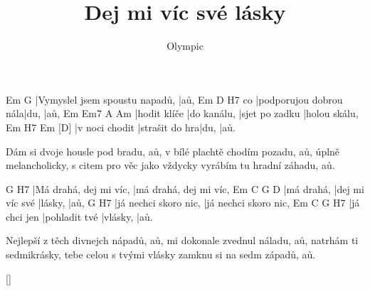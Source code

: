 \documentclass{song}
\title{Dej mi víc své lásky}
\author{Olympic}
\begin{document}
\strophe
Em                             G
|Vymyslel jsem spoustu napadů, |aů,
   Em                     D    H7
co |podporujou dobrou nála|du, |aů,
Em           Em7         A              Am
|hodit klíče |do kanálu, |sjet po zadku |holou skálu,
Em             H7             Em   [D]
|v noci chodit |strašit do hra|du, |aů.
\endstrophe

\strophe*
Dám si dvoje housle pod bradu, aů,
v bílé plachtě chodím pozadu, aů,
úplně melancholicky, s citem pro věc jako vždycky
vyrábím tu hradní záhadu, aů.
\endstrophe

G                      H7
|Má drahá, dej mi víc, |má drahá, dej mi víc,
Em         C               G       D
|má drahá, |dej mi víc své |lásky, |aů,
G                     H7
|já nechci skoro nic, |já nechci skoro nic,
Em           C             G        H7
|já chci jen |pohladit tvé |vlásky, |aů.
\endstrophe

\strophe*
Nejlepší z těch divnejch nápadů, aů,
mi dokonale zvednul náladu, aů,
natrhám ti sedmikrásky, tebe celou s tvými vlásky
zamknu si na sedm západů, aů.
\endstrophe

\ref{}
\end{document}
